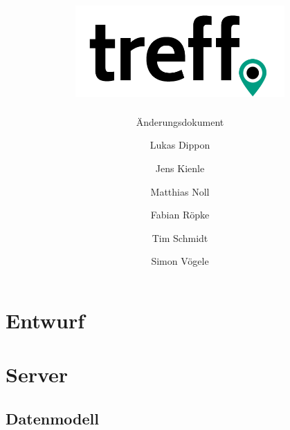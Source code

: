 \documentclass[parskip=full,11pt]{scrartcl}
\title{\includegraphics[width = 80mm]{images/logo_crop.png}}
\subtitle{\huge Änderungsdokument}
\author{Lukas Dippon
        \and Jens Kienle
        \and Matthias Noll
        \and Fabian Röpke
        \and Tim Schmidt
        \and Simon Vögele}
\begin{document}
\maketitle
\thispagestyle{empty} %

\pagebreak
\tableofcontents

\pagebreak
\section{Entwurf}



\pagebreak
\section{Server}

\subsection{Datenmodell}
\end{document}
